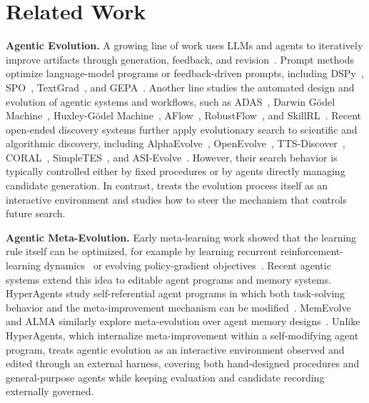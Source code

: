 \section{Related Work}
\label{sec:related_work}

\textbf{Agentic Evolution.}
A growing line of work uses LLMs and agents to iteratively improve artifacts through generation, feedback, and revision~\citep{DBLP:conf/icml/Li0FXC0L25,li2026deepeye,DBLP:journals/corr/abs-2510-17586,wu2026autowebworldsynthesizinginfiniteverifiable}. 
Prompt methods optimize language-model programs or feedback-driven prompts, including DSPy~\citep{khattab2024dspy}, SPO~\citep{xiang2025self}, TextGrad~\citep{yuksekgonul2024textgrad}, and GEPA~\citep{agrawal2025gepa}. 
Another line studies the automated design and evolution of agentic systems and workflows, such as ADAS~\citep{hu2024automated}, Darwin G\"odel Machine~\citep{zhang2025darwin}, Huxley-G\"odel Machine~\citep{wang2025huxley}, AFlow~\citep{zhang2024aflow}, RobustFlow~\citep{xu2025robustflow}, and SkillRL~\citep{xia2026skillrl}. 
Recent open-ended discovery systems further apply evolutionary search to scientific and algorithmic discovery, including AlphaEvolve~\citep{novikov2025alphaevolve}, OpenEvolve~\citep{openevolve}, TTS-Discover~\citep{yuksekgonul2026learning}, CORAL~\citep{qu2026coral}, SimpleTES~\citep{ye2026evaluation}, and ASI-Evolve~\citep{xu2026asi}. 
However, their search behavior is typically controlled either by fixed procedures or by agents directly managing candidate generation. 
In contrast, \method treats the evolution process itself as an interactive environment and studies how to steer the mechanism that controls future search.

\textbf{Agentic Meta-Evolution.}
Early meta-learning work showed that the learning rule itself can be optimized, for example by learning recurrent reinforcement-learning dynamics~\citep{wang2016learning} or evolving policy-gradient objectives~\citep{houthooft2018evolved}.
Recent agentic systems extend this idea to editable agent programs and memory systems.
HyperAgents study self-referential agent programs in which both task-solving behavior and the meta-improvement mechanism can be modified~\citep{zhang2026hyperagents}.
MemEvolve and ALMA similarly explore meta-evolution over agent memory designs~\citep{zhang2025memevolve, xiong2026learning}.
Unlike HyperAgents, which internalize meta-improvement within a self-modifying agent program, \method treats agentic evolution as an interactive environment observed and edited through an external harness, covering both hand-designed procedures and general-purpose agents while keeping evaluation and candidate recording externally governed.
